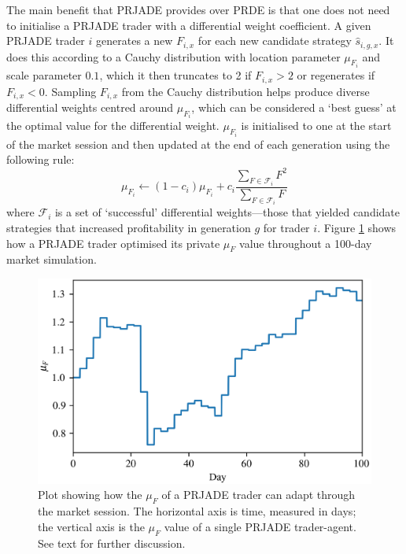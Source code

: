 \documentclass[a4paper,twoside]{article}
\begin{document}
The main benefit that PRJADE provides over PRDE is that one does not need to initialise a PRJADE trader with a differential weight coefficient.
A given PRJADE trader $i$ generates a new $F_{i,x}$ for each new candidate strategy $\hat{s}_{i,g,x}$.
It does this according to a Cauchy distribution with location parameter $\mu_{F_i}$ and scale parameter $0.1$, which it then truncates to 2 if $F_{i,x}>2$ or regenerates if $F_{i,x}<0$.
Sampling $F_{i,x}$ from the Cauchy distribution helps produce diverse differential weights centred around $\mu_{F_i}$, which can be considered a `best guess' at the optimal value for the differential weight.
$\mu_{F_i}$ is initialised to one at the start of the market session and then updated at the end of each generation using the following rule:
\begin{equation}
    \mu_{F_i}\leftarrow (1-c_i)\mu_{F_i} + c_i\frac{\sum_{F\in \mathcal{F}_i} F^2}{\sum_{F\in\mathcal{F}_i} F}
\end{equation}
where $\mathcal{F}_i$ is a set of `successful' differential weights---those that yielded candidate strategies that increased profitability in generation $g$ for trader $i$.
Figure \ref{mu_F} shows how a PRJADE trader optimised its private $\mu_F$ value throughout a 100-day market simulation.

\begin{figure}[htbp]
    \centerline{\includegraphics[width=\columnwidth]{mu_F_2.0.png}}
    \caption{
        Plot showing how the $\mu_F$ of a PRJADE trader can adapt through the market session.
        The horizontal axis is time, measured in days; the vertical axis is the $\mu_F$ value of a single PRJADE trader-agent.
        See text for further discussion.
    }
    \label{mu_F}
\end{figure}
\end{document}
